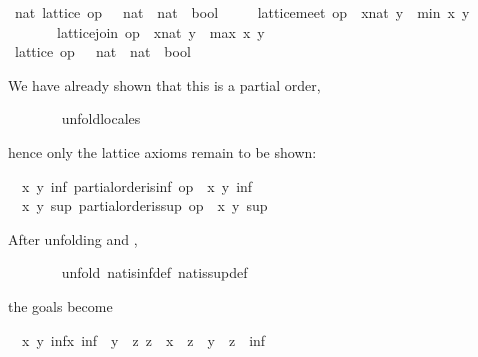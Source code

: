 \begin{isabellebody}
%
\isatagvisible
{}\isamarkupfalse%
\ nat{\isacharcolon}\ lattice\ {\isachardoublequoteopen}op\ {\isasymle}\ {\isacharcolon}{\isacharcolon}\ nat\ {\isasymRightarrow}\ nat\ {\isasymRightarrow}\ bool{\isachardoublequoteclose}\isanewline
\ \ \ \ \ {\isachardoublequoteopen}lattice{\isachardot}meet\ op\ {\isasymle}\ {\isacharparenleft}x{\isacharcolon}{\isacharcolon}nat{\isacharparenright}\ y\ {\isacharequal}\ min\ x\ y{\isachardoublequoteclose}\isanewline
\ \ \ \ \ \ \ {\isachardoublequoteopen}lattice{\isachardot}join\ op\ {\isasymle}\ {\isacharparenleft}x{\isacharcolon}{\isacharcolon}nat{\isacharparenright}\ y\ {\isacharequal}\ max\ x\ y{\isachardoublequoteclose}\isanewline
\ \ \isamarkupfalse%
\ {\isacharminus}\isanewline
\ \ \ \ \isamarkupfalse%
\ {\isachardoublequoteopen}lattice\ {\isacharparenleft}op\ {\isasymle}\ {\isacharcolon}{\isacharcolon}\ nat\ {\isasymRightarrow}\ nat\ {\isasymRightarrow}\ bool{\isacharparenright}{\isachardoublequoteclose}%
\begin{isamarkuptxt}%
\normalsize We have already shown that this is a partial
	order,%
\end{isamarkuptxt}%
\isamarkuptrue%
\ \ \ \ \ \ \isamarkupfalse%
\ unfold{\isacharunderscore}locales%
\begin{isamarkuptxt}%
\normalsize hence only the lattice axioms remain to be
	shown: \begin{isabelle}%
\ {}{\isachardot}\ {\isasymAnd}x\ y{\isachardot}\ {\isasymexists}inf{\isachardot}\ partial{\isacharunderscore}order{\isachardot}is{\isacharunderscore}inf\ op\ {\isasymle}\ x\ y\ inf\isanewline
\ {}{\isachardot}\ {\isasymAnd}x\ y{\isachardot}\ {\isasymexists}sup{\isachardot}\ partial{\isacharunderscore}order{\isachardot}is{\isacharunderscore}sup\ op\ {\isasymle}\ x\ y\ sup%
\end{isabelle}  After unfolding  and
	,%
\end{isamarkuptxt}%
\isamarkuptrue%
\ \ \ \ \ \ \isamarkupfalse%
\ {\isacharparenleft}unfold\ nat{\isachardot}is{\isacharunderscore}inf{\isacharunderscore}def\ nat{\isachardot}is{\isacharunderscore}sup{\isacharunderscore}def{\isacharparenright}%
\begin{isamarkuptxt}%
\normalsize the goals become \begin{isabelle}%
\ {}{\isachardot}\ {\isasymAnd}x\ y{\isachardot}\ {\isasymexists}inf{\isasymle}x{\isachardot}\ inf\ {\isasymle}\ y\ {\isasymand}\ {\isacharparenleft}{\isasymforall}z{\isachardot}\ z\ {\isasymle}\ x\ {\isasymand}\ z\ {\isasymle}\ y\ {\isasymlongrightarrow}\ z\ {\isasymle}\ inf{\isacharparenright}\isanewline

\end{isabelle}
\end{isamarkuptxt}
\end{isabellebody}
